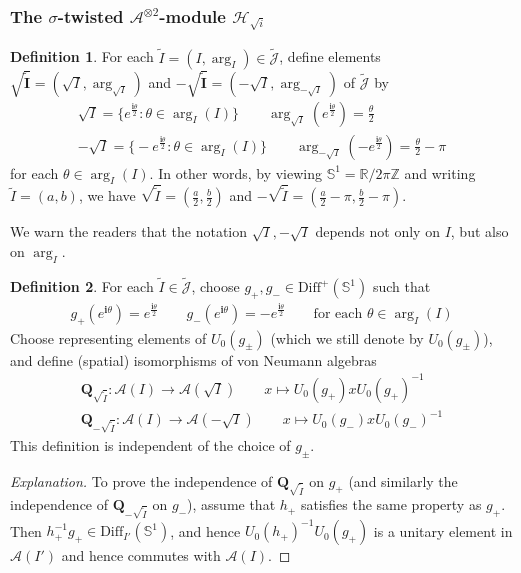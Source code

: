 \documentclass[11pt,b5paper,notitlepage]{article}
\theoremstyle{definition}
\newtheorem{df}{Definition}[section]
\theoremstyle{plain}
\newcommand{\wtd}{\widetilde}
\newcommand{\Diff}{\mathrm{Diff}}
\newcommand{\DiffS}{\mathrm{Diff}^+(\mathbb S^1)}
\newcommand{\Jtd}{\widetilde{\mathcal J}}
\newcommand{\im}{\mathbf{i}}
\newcommand{\mbf}{\mathbf}
\newcommand{\Zbb}{\mathbb Z}
\newcommand{\Rbb}{\mathbb R}
\newcommand{\Sbb}{{\mathbb S}}
\newcommand{\MA}{\mathcal A}
\newcommand{\MH}{\mathcal H}
\newcommand{\Maa}{{\mathcal A^{\otimes 2}}}
\numberwithin{equation}{section}
\begin{document}
\subsubsection{The $\sigma$-twisted $\Maa$-module $\MH_{\sqrt i}$}\label{lb57}



\begin{df}
For each $\wtd I=(I,\arg_I)\in\Jtd$, define elements $\pmb{\sqrt{\wtd I}}=(\sqrt I,\arg_{\sqrt I})$ and $\pmb{-\sqrt{\wtd I}}=(-\sqrt I,\arg_{-\sqrt I})$ of $\Jtd$ by
\begin{gather*}
\sqrt I=\big\{e^{\frac{\im\theta}2}:\theta\in\arg_I(I)\big\}\qquad \arg_{\sqrt I}(e^{\frac{\im\theta}2})=\frac{\theta}2 \\
-\sqrt I=\big\{-e^{\frac{\im\theta}2}:\theta\in\arg_I(I)\big\}\qquad\arg_{-\sqrt I}(-e^{\frac{\im\theta}2})=\frac\theta 2-\pi
\end{gather*}
for each $\theta\in\arg_I(I)$. In other words, by viewing $\Sbb^1=\Rbb/2\pi\Zbb$ and writing $\wtd I=(a,b)$, we have $\sqrt{\wtd I}=(\frac a2,\frac b2)$ and $-\sqrt{\wtd I}=(\frac a2-\pi,\frac b2-\pi)$.
\end{df}

We warn the readers that the notation $\sqrt I,-\sqrt I$ depends not only on $I$, but also on $\arg_I$.

\begin{df}\label{lb50}
For each $\wtd I\in\Jtd$, choose $g_+,g_-\in\DiffS$ such that
\begin{align*}
g_+(e^{\im\theta})=e^{\frac{\im\theta}2}\qquad g_-(e^{\im\theta})=-e^{\frac{\im\theta}2}\qquad\text{for each }\theta\in\arg_I(I)
\end{align*}
Choose representing elements of $U_0(g_\pm)$ (which we still denote by $U_0(g_\pm)$), and define (spatial) isomorphisms of von Neumann algebras
\begin{gather*}
\mbf Q_{\sqrt{\wtd I}}:\MA(I)\rightarrow\MA(\sqrt I)\qquad x\mapsto U_0(g_+)xU_0(g_+)^{-1}\\
\mbf Q_{-\sqrt{\wtd I}}:\MA(I)\rightarrow\MA(-\sqrt I)\qquad x\mapsto U_0(g_-)xU_0(g_-)^{-1}
\end{gather*}
This definition is independent of the choice of $g_\pm$.
\end{df}

\begin{proof}[Explanation]
To prove the independence of $\mbf Q_{\sqrt{\wtd I}}$ on $g_+$ (and similarly the independence of $\mbf Q_{-\sqrt{\wtd I}}$ on $g_-$), assume that $h_+$ satisfies the same property as $g_+$. Then $h_+^{-1}g_+\in\Diff_{I'}(\Sbb^1)$, and hence $U_0(h_+)^{-1}U_0(g_+)$ is a unitary element in $\MA(I')$ and hence commutes with $\MA(I)$. 
\end{proof}
\end{document}

